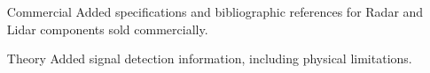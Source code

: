 \begin{itemize}
\item[Commercial] Added specifications and bibliographic references for Radar and Lidar components sold commercially.
\item[Theory] Added signal detection information, including physical limitations.
\end{itemize}